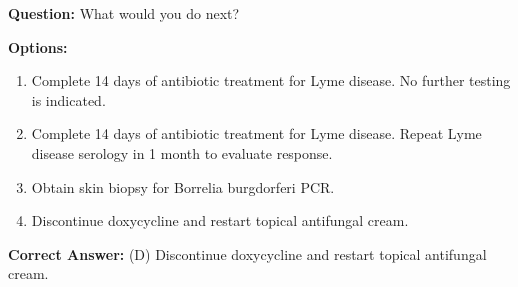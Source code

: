 \documentclass[11pt]{article}
\begin{document}
\begin{tcolorbox}[colback=blue!3!white, colframe=blue!50!white,
                  title=Example of QA Data (from JAMA QA ID1049), left=10mm, breakable]
\bigskip
\textbf{Question: }What would you do next?

\bigskip
\textbf{Options:}
\begin{enumerate}[label=\Alph*.]
    \item Complete 14 days of antibiotic treatment for Lyme disease. No further testing is indicated.
    \item Complete 14 days of antibiotic treatment for Lyme disease. Repeat Lyme disease serology in 1 month to evaluate response.
    \item Obtain skin biopsy for Borrelia burgdorferi PCR.
    \item Discontinue doxycycline and restart topical antifungal cream.
\end{enumerate}

\bigskip
\textbf{Correct Answer:} (D) Discontinue doxycycline and restart topical antifungal cream.

\bigskip
\noindent
\label{tab:label_landscape_comparison}


\end{tcolorbox}
\end{document}
